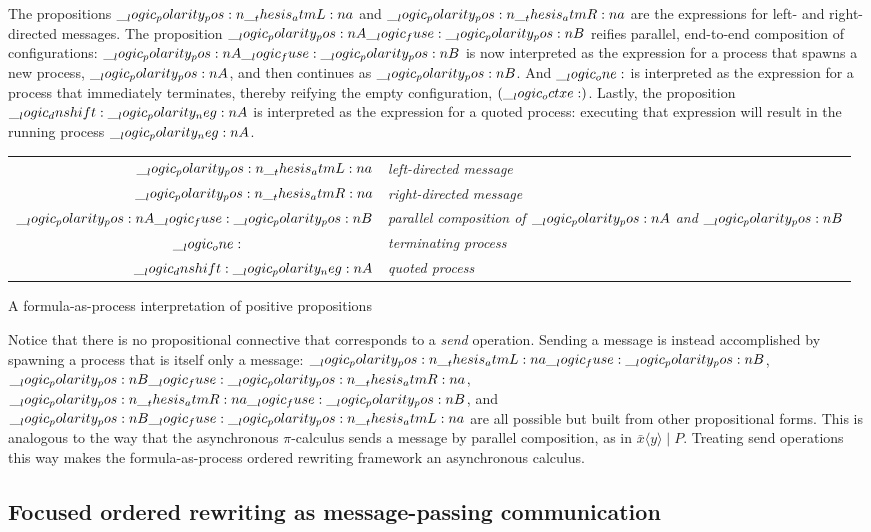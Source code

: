 The propositions $\__logic_polarity_pos:n {\__thesis_atmL:n {a}}$ and $\__logic_polarity_pos:n {\__thesis_atmR:n {a}}$ are the expressions for left- and right-directed messages.
The proposition $\__logic_polarity_pos:n {A} \__logic_fuse: \__logic_polarity_pos:n {B}$ reifies parallel, end-to-end composition of configurations: $\__logic_polarity_pos:n {A} \__logic_fuse: \__logic_polarity_pos:n {B}$ is now interpreted as the expression for a process that spawns a new process, $\__logic_polarity_pos:n {A}$, and then continues as $\__logic_polarity_pos:n {B}$.
And $\__logic_one:$ is interpreted as the expression for a process that immediately terminates, thereby reifying the empty configuration, $(\__logic_octxe:)$.
Lastly, the proposition $\__logic_dnshift: \__logic_polarity_neg:n {A}$ is interpreted as the expression for a quoted process: executing that expression will result in the running process $\__logic_polarity_neg:n {A}$.
%
\begin{margintable}
  \begin{center}
    \begin{tabular}{@{}r@{\enspace}>{\itshape}l@{}}
      $\__logic_polarity_pos:n {\__thesis_atmL:n {a}}$ & left-directed message \\
      $\__logic_polarity_pos:n {\__thesis_atmR:n {a}}$ & right-directed message \\
      $\__logic_polarity_pos:n {A} \__logic_fuse: \__logic_polarity_pos:n {B}$ & parallel composition of $\__logic_polarity_pos:n {A}$ and $\__logic_polarity_pos:n {B}$ \\
      $\one\hphantom{\p{}}$ & terminating process \\
      $\__logic_dnshift: \__logic_polarity_neg:n {A}$ & quoted process
    \end{tabular}
  \end{center}
  \caption{A formula-as-process interpretation of positive propositions}\label{fig:choreographies:posprop-table}
\end{margintable}

Notice that there is no propositional connective that corresponds to a \emph{send} operation.
Sending a message is instead accomplished by spawning a process that is itself only a message: $\__logic_polarity_pos:n {\__thesis_atmL:n {a}} \__logic_fuse: \__logic_polarity_pos:n {B}$, $\__logic_polarity_pos:n {B} \__logic_fuse: \__logic_polarity_pos:n {\__thesis_atmR:n {a}}$, $\__logic_polarity_pos:n {\__thesis_atmR:n {a}} \__logic_fuse: \__logic_polarity_pos:n {B}$, and $\__logic_polarity_pos:n {B} \__logic_fuse: \__logic_polarity_pos:n {\__thesis_atmL:n {a}}$ are all possible but built from other propositional forms.
This is analogous to the way that the asynchronous $\pi$-calculus sends a message by parallel composition, as in $\bar{x}\langle y\rangle \mid P$.
Treating send operations this way makes the formula-as-process ordered rewriting framework an asynchronous calculus.

\subsection{Focused ordered rewriting as message-passing communication}


